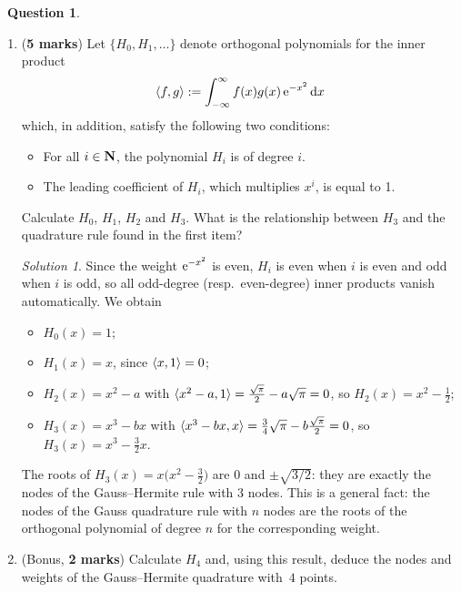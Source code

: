 \documentclass[10pt]{article}
\theoremstyle{definition}
\newtheorem{question}{{\normalfont \faGears}~Question}
\theoremstyle{remark}
\newtheorem*{protosolution}{Solution}
\renewcommand{\mymarks}[1]{\textbf{#1 marks}}
\newenvironment{solutionframe}
{%
    \begin{mdframed}[
        leftmargin=1cm,
        skipabove=.3cm,
        linecolor=blue,
        backgroundcolor=lightgreen,
        linewidth=0pt,
        innerleftmargin=.5em,
        innerrightmargin=.5em,
        innertopmargin=.3em,
        innerbottommargin=.6em,
    ]
}
{
    \end{mdframed}
}
\newenvironment{solution}
{\pushQED{\qed}\renewcommand{\qedsymbol}{$\triangle$}
\begin{solutionframe}\small \begin{protosolution}}
{\popQED\end{protosolution}\end{solutionframe}}
\begin{document}
\begin{question}
\begin{enumerate}
\item (\mymarks{5})
    Let $\{H_0, H_1, \dotsc\}$ denote orthogonal polynomials for the inner product
    \[
        \langle f, g\rangle := \int_{-\infty}^{\infty} f(x) g(x) \, \mathrm e^{-x^2} \, \mathrm d x
    \]
    which, in addition,
    satisfy the following two conditions:
    \begin{itemize}
        \item
            For all $i \in \mathbf N$, the polynomial $H_i$ is of degree $i$.
        \item
            The leading coefficient of $H_i$, which multiplies $x^i$, is equal to 1.
    \end{itemize}
    Calculate $H_0$, $H_1$, $H_2$ and $H_3$.
    What is the relationship between \(H_3\) and the quadrature rule found in the first item?

\begin{solution}
    Since the weight $\mathrm e^{-x^2}$ is even,
    $H_i$ is even when $i$ is even and odd when $i$ is odd,
    so all odd-degree (resp.\ even-degree) inner products vanish automatically.
    We obtain
    \begin{itemize}
        \item $H_0(x) = 1$;
        \item $H_1(x) = x$, since $\langle x, 1\rangle = 0$;
        \item $H_2(x) = x^2 - a$ with $\langle x^2 - a, 1\rangle = \frac{\sqrt{\pi}}{2} - a \sqrt{\pi} = 0$, so $H_2(x) = x^2 - \frac{1}{2}$;
        \item $H_3(x) = x^3 - b x$ with $\langle x^3 - bx, x\rangle = \frac{3}{4}\sqrt{\pi} - b \frac{\sqrt{\pi}}{2} = 0$, so $H_3(x) = x^3 - \frac{3}{2} x$.
    \end{itemize}
    The roots of $H_3(x) = x \bigl(x^2 - \frac{3}{2}\bigr)$ are $0$ and $\pm \sqrt{3/2}$:
    they are exactly the nodes of the Gauss--Hermite rule with 3 nodes.
    This is a general fact: the nodes of the Gauss quadrature rule with $n$ nodes
    are the roots of the orthogonal polynomial of degree $n$ for the corresponding weight.
\end{solution}

\item (Bonus, \mymarks{2})
    Calculate $H_4$ and, using this result,
    deduce the nodes and weights of the Gauss--Hermite quadrature with~$4$ points.


\end{enumerate}
\end{question}
\end{document}
